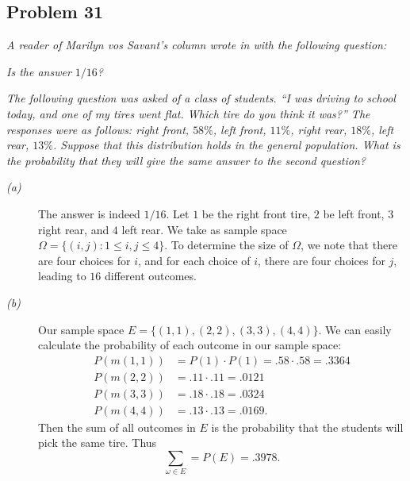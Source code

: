\documentclass{tufte-handout}
\begin{document}
\subsection{Problem 31}
\begin{description}
\item \textit{A reader of Marilyn vos Savant's column wrote in with
    the following question: }
\item[(a)] \textit{Is the answer $1/16$?}
\item[(b)] \textit{The following question was asked of a class of
    students. ``I was driving to school today, and one of my tires
    went flat. Which tire do you think it was?'' The responses were as
    follows: right front, $58\%$, left front, $11\%$, right rear,
    $18\%$, left rear, $13\%$. Suppose that this distribution holds in
    the general population. What is the probability that they will
    give the same answer to the second question?}
\end{description}

\begin{description}
\item[\emph{(a)}] The answer is indeed $1/16$. Let $1$ be the right front
  tire, $2$ be left front, $3$ right rear, and $4$ left rear. We take as sample space
  $\Omega = \{ (i,j) : 1 \leq i,j \leq 4\}$. To determine the size of
  $\Omega$, we note that there are four choices for $i$, and for each
  choice of $i$, there are four choices for $j$, leading to $16$
  different outcomes.
\item[\emph{(b)}] Our sample space $E =
  \{(1,1),(2,2),(3,3),(4,4)\}$. We can easily calculate the
  probability of each outcome in our sample space:
  \begin{align*}
    P(m(1,1)) &= P(1) \cdot P(1) = .58 \cdot .58 = .3364\\
    P(m(2,2)) &= .11 \cdot .11 = .0121\\
    P(m(3,3)) &= .18 \cdot .18 = .0324\\
    P(m(4,4)) &= .13 \cdot .13 = .0169.
  \end{align*}
  Then the sum of all outcomes in $E$ is the probability that the
  students will pick the same tire. Thus
  \[\sum_{\omega \in E} = P(E) = .3978.\]
\end{description}
\end{document}
